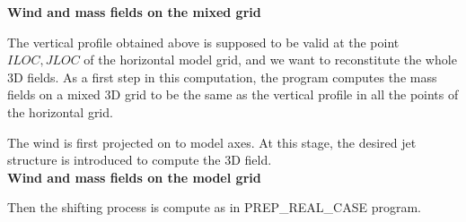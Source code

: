 {\bf Wind and mass fields on the mixed grid}

The vertical profile obtained above is supposed to be valid at the point
$ILOC,JLOC$ of the horizontal model grid, and we want to reconstitute the
whole 3D fields.  As a first step in this computation, the program computes
the mass fields on a mixed 3D grid to be the same as the vertical profile in all 
the points of the horizontal grid. 

The wind is first projected on to model axes. At this stage,
the desired jet structure is introduced to compute the 3D field.\\

{\bf Wind and mass fields on the model grid}

Then the shifting process is compute as in PREP\_REAL\_CASE program.

